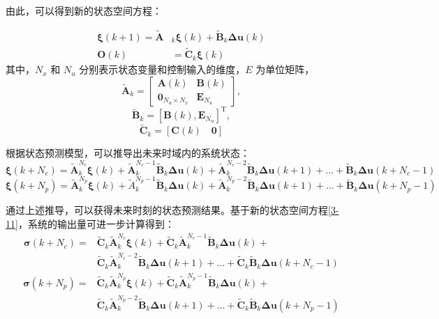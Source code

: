 \documentclass[lang=chs, degree=master, blindreview=false, winfonts=true]{yanputhesis}
\begin{document}
由此，可以得到新的状态空间方程：

\begin{equation}
	\begin{aligned}\bm \xi(k+1)=\tilde{\bm A}&_k\bm \xi(k)+\tilde{\bm B}_k\bm \Delta \bm u(k)\\\bm O(k)&=\tilde{\bm C}_k\bm\xi(k)\end{aligned}
	\label{3-11}
\end{equation}
其中，$N_x$ 和 $N_u$ 分别表示状态变量和控制输入的维度，$E$ 为单位矩阵，
$$\bm{\tilde{A}}_k = \begin{bmatrix} \bm A(k) & \bm B(k) \\ \bm 0_{N_u \times N_x} & \bm E_{N_u} \end{bmatrix},$$
$$\tilde{\bm B}_k = \left[ \bm B(k) , \bm E_{N_u} \right]^\mathrm{T},$$
$$\tilde{\bm C}_k = \left[ \bm C(k) \quad \bm 0 \right]$$

根据状态预测模型，可以推导出未来时域内的系统状态：
\begin{equation}
    \bm \xi(k + N_c) = \tilde{\bm A}_k^{N_c} \bm \xi(k) + \tilde{\bm A}_k^{N_c-1} \tilde{\bm B}_k \bm \Delta \bm u(k) + \tilde{\bm A}_k^{N_c-2} \bm \tilde{\bm B}_k \bm \Delta \bm u(k+1) + \dots + \tilde{\bm B}_k \bm \Delta \bm u(k + N_c - 1)
\end{equation}
\begin{equation}
    \bm \xi(k + N_p) = \tilde{\bm A}_k^{N_p} \bm \xi(k) + \tilde{A}_k^{N_p-1} \tilde{\bm B}_k \bm \Delta \bm u(k) + \tilde{\bm A}_k^{N_p-2} \tilde{\bm B}_k \bm \Delta \bm u(k+1) + \dots + \tilde{\bm B}_k \bm \Delta \bm u(k + N_p - 1)
\end{equation}

通过上述推导，可以获得未来时刻的状态预测结果。基于新的状态空间方程\autoref{3-11}，系统的输出量可进一步计算得到：
\begin{equation}
	\begin{aligned}
	\bm \sigma(k + N_c) =& \tilde{\bm C}_k \tilde{\bm A}_k^{N_c} \bm \xi(k) + \tilde{\bm C}_k \tilde{\bm A}_k^{N_c-1} \tilde{\bm B}_k \bm \Delta \bm u(k) +\\
	&\tilde{\bm C}_k \tilde{\bm A}_k^{N_c-2} \tilde{\bm B}_k \bm \Delta \bm u(k+1) + \dots + \tilde{\bm C}_k \tilde{\bm B}_k \bm \Delta \bm u(k + N_c - 1)
	\end{aligned}
\end{equation}
\begin{equation}
	\begin{aligned}
	\bm  \sigma(k + N_p) =& \tilde{\bm C}_k \tilde{\bm A}_k^{N_p}\bm  \xi(k) + \tilde{\bm C}_k \tilde{\bm A}_k^{N_p-1} \tilde{\bm B}_k \bm \Delta \bm u(k) +\\
	&\tilde{\bm C}_k \tilde{\bm A}_k^{N_p-2} \tilde{\bm B}_k \bm \Delta \bm u(k+1) + \dots + \tilde{\bm C}_k \tilde{\bm B}_k \bm  \Delta \bm u(k + N_p - 1)
	\end{aligned}
\end{equation}
\end{document}
